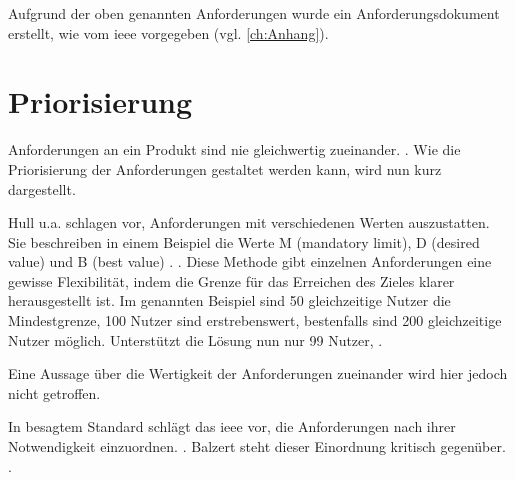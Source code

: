 Aufgrund der oben genannten Anforderungen wurde ein Anforderungsdokument erstellt, wie vom \ac{ieee} vorgegeben (vgl. \autoref{ch:Anhang}). 

\section{Priorisierung}

Anforderungen an ein Produkt sind nie gleichwertig zueinander. 
 \citep[][83]{Hull2010}. Wie die Priorisierung der Anforderungen gestaltet werden kann, wird nun kurz dargestellt.

Hull u.a. schlagen vor, Anforderungen mit verschiedenen Werten auszustatten. Sie beschreiben in einem Beispiel die Werte M (mandatory limit), D (desired value) und B (best value) \citep[vgl.][83]{Hull2010}.  \citep[][83]{Hull2010}.
Diese Methode gibt einzelnen Anforderungen eine gewisse Flexibilität, indem die Grenze für das Erreichen des Zieles klarer herausgestellt ist. Im genannten Beispiel sind 50 gleichzeitige Nutzer die Mindestgrenze, 100 Nutzer sind erstrebenswert, bestenfalls sind 200 gleichzeitige Nutzer möglich. Unterstützt die Lösung nun nur 99 Nutzer,  \citep[][83]{Hull2010}.

Eine Aussage über die Wertigkeit der Anforderungen zueinander wird hier jedoch nicht getroffen. 

In besagtem Standard schlägt das \ac{ieee} vor, die Anforderungen nach ihrer Notwendigkeit einzuordnen.  \citep[][7]{ieee1998}. Balzert steht dieser Einordnung kritisch gegenüber.  \citep[][543]{Balzert2010}.

